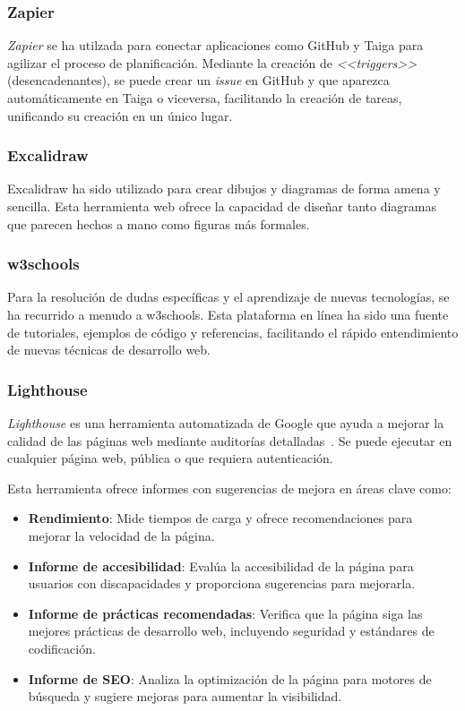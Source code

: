 \subsubsection{Zapier}
\textit{Zapier} se ha utilzada para conectar aplicaciones como GitHub y Taiga para agilizar el proceso de planificación. Mediante la creación de \textit{<<triggers>>} (desencadenantes), se puede crear un \textit{issue} en GitHub y que aparezca automáticamente en Taiga o viceversa, facilitando la creación de tareas, unificando su creación en un único lugar.

\subsubsection{Excalidraw}
Excalidraw ha sido utilizado para crear dibujos y diagramas de forma amena y sencilla. Esta herramienta web ofrece la capacidad de diseñar tanto diagramas que parecen hechos a mano como figuras más formales.

\subsubsection{w3schools}
Para la resolución de dudas específicas y el aprendizaje de nuevas tecnologías, se ha recurrido a menudo a w3schools. Esta plataforma en línea ha sido una fuente de tutoriales, ejemplos de código y referencias, facilitando el rápido entendimiento de nuevas técnicas de desarrollo web.

\subsubsection{Lighthouse}
\textit{Lighthouse} es una herramienta automatizada de Google que ayuda a mejorar la calidad de las páginas web mediante auditorías detalladas~\cite{web:lighthouse}. Se puede ejecutar en cualquier página web, pública o que requiera autenticación.

Esta herramienta ofrece informes con sugerencias de mejora en áreas clave como:
\begin{itemize}
	\item \textbf{Rendimiento}: Mide tiempos de carga y ofrece recomendaciones para mejorar la velocidad de la página.
	\item \textbf{Informe de accesibilidad}: Evalúa la accesibilidad de la página para usuarios con discapacidades y proporciona sugerencias para mejorarla.
	\item \textbf{Informe de prácticas recomendadas}: Verifica que la página siga las mejores prácticas de desarrollo web, incluyendo seguridad y estándares de codificación.
	\item \textbf{Informe de SEO}: Analiza la optimización de la página para motores de búsqueda y sugiere mejoras para aumentar la visibilidad.
\end{itemize}

